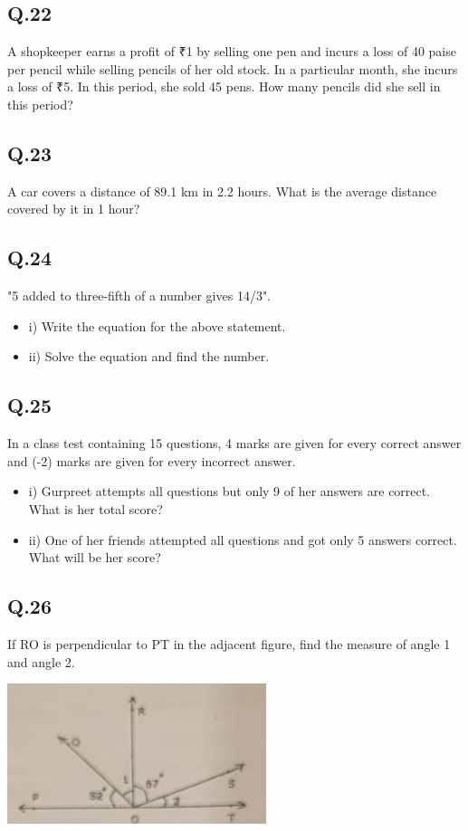 \documentclass[11pt]{article}
\begin{document}
\subsection*{Q.22}
\label{sec:org7d7d10d}
A shopkeeper earns a profit of ₹1 by selling one pen and incurs a loss of 40 paise per pencil while selling pencils of her old stock. In a particular month, she incurs a loss of ₹5. In this period, she sold 45 pens. How many pencils did she sell in this period?
\subsection*{Q.23}
\label{sec:org460101b}
A car covers a distance of 89.1 km in 2.2 hours. What is the average distance covered by it in 1 hour?
\subsection*{Q.24}
\label{sec:org5c02ef7}
"5 added to three-fifth of a number gives 14/3".
\begin{itemize}
\item i) Write the equation for the above statement.
\item ii) Solve the equation and find the number.
\end{itemize}
\subsection*{Q.25}
\label{sec:org355c39a}
In a class test containing 15 questions, 4 marks are given for every correct answer and (-2) marks are given for every incorrect answer.
\begin{itemize}
\item i) Gurpreet attempts all questions but only 9 of her answers are correct. What is her total score?
\item ii) One of her friends attempted all questions and got only 5 answers correct. What will be her score?
\end{itemize}
\subsection*{Q.26}
\label{sec:org3aea945}
If RO is perpendicular to PT in the adjacent figure, find the measure of angle 1 and angle 2.
\begin{center}
\includegraphics[width=.9\linewidth]{./maths26.png}
\end{center}
\end{document}
